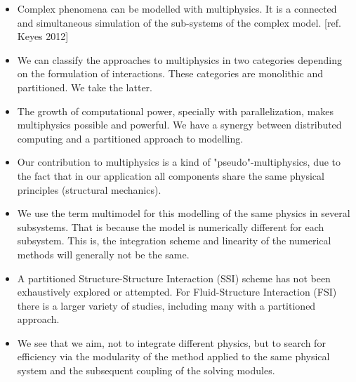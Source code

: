 \documentclass[a4paper, 11pt, oneside]{Thesis}  %
\begin{document}
    \begin{itemize}
        \item Complex phenomena can be modelled with multiphysics. It is a connected and simultaneous simulation of the sub-systems of the complex model. [ref. Keyes 2012]
        \item We can classify the approaches to multiphysics in two categories depending on the formulation of interactions. These categories are monolithic and partitioned. We take the latter.
        \item The growth of computational power, specially with parallelization, makes multiphysics possible and powerful. We have a synergy between distributed computing and a partitioned approach to modelling.
        \item Our contribution to multiphysics is a kind of "pseudo"-multiphysics, due to the fact that in our application all components share the same physical principles (structural mechanics).
        \item We use the term multimodel for this modelling of the same physics in several subsystems. That is because the model is numerically different for each subsystem. This is, the integration scheme and linearity of the numerical methods will generally not be the same.
        \item A partitioned Structure-Structure Interaction (SSI) scheme has not been exhaustively explored or attempted. For Fluid-Structure Interaction (FSI) there is a larger variety of studies, including many with a partitioned approach. 
        \item We see that we aim, not to integrate different physics, but to search for efficiency via the modularity of the method applied to the same physical system and the subsequent coupling of the solving modules.
        



\end{itemize}
\end{document}

